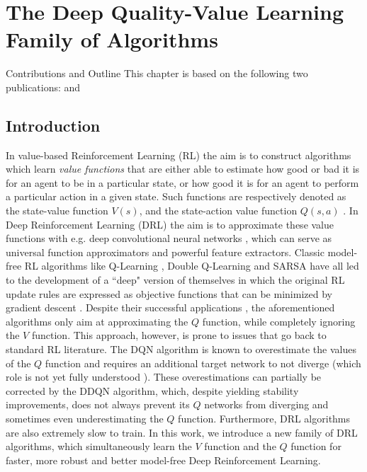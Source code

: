 
\chapter{The Deep Quality-Value Learning Family of Algorithms} %
\label{ch:dqv_family_of_algorithms} %


\begin{remark}{Contributions and Outline}
	This chapter is based on the following two publications: \citet{sabatelli2018deepqv} and \citet{sabatelli2020deep}
	\vspace{5mm}
\end{remark}

\section{Introduction}               
In value-based Reinforcement Learning (RL) the aim is to construct algorithms which learn \textit{value functions} that are either able to estimate how good or bad it is for an agent to be in a particular state, or how good it is for an agent to perform a particular action in a given state. Such functions are respectively denoted as the state-value function $V(s)$, and the state-action value function $Q(s,a)$ \cite{sutton2018reinforcement}. In Deep Reinforcement Learning (DRL) the aim is to approximate these value functions with e.g. deep convolutional neural networks \cite{lecun2015deep}, which can serve as universal function approximators and powerful feature extractors. Classic model-free RL algorithms like Q-Learning \cite{watkins1992q}, Double Q-Learning \cite{hasselt2010double} and SARSA \cite{rummery1994line} have all led to the development of a ``deep" version of themselves in which the original RL update rules are expressed as objective functions that can be minimized by gradient descent \cite{mnih2015human, van2016deep, zhao2016deep}. Despite their successful applications \cite{li2017deep}, the aforementioned algorithms only aim at approximating the $Q$ function, while completely ignoring the $V$ function. This approach, however, is prone to issues that go back to standard RL literature. The DQN algorithm \cite{mnih2015human} is known to overestimate the values of the $Q$ function \cite{van2016deep} and requires an additional target network to not diverge (which role is not yet fully understood \cite{achiam2019towards}). These overestimations can partially be corrected by the DDQN \cite{van2016deep} algorithm, which, despite yielding stability improvements, does not always prevent its $Q$ networks from diverging \cite{van2018deep} and sometimes even underestimating the $Q$ function. Furthermore, DRL algorithms are also extremely slow to train. In this work, we introduce a new family of DRL algorithms, which simultaneously learn the $V$ function and the $Q$ function for faster, more robust and better model-free Deep Reinforcement Learning. %

